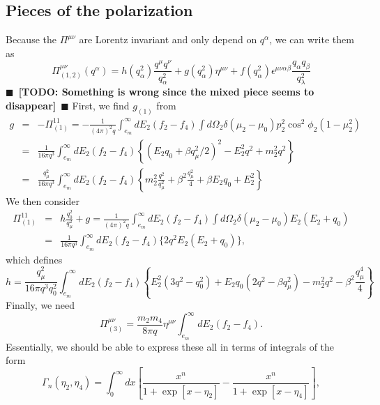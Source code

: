 \documentclass[12pt,letter]{article}
\newcommand{\todo}[1]{{$\blacksquare$~\textbf{\color{blue}[TODO: #1]}}~$\blacksquare$}
\begin{document}
\subsection{Pieces of the polarization}
Because the $\Pi^{\mu \nu}$ are Lorentz invariant and only depend on $q^\alpha$, we can write them as   
\begin{equation}
\Pi_{(1,2)}^{\mu \nu}(q^\alpha) = h(q_\alpha^2) \frac{q^\mu q^\nu}{q_\alpha^2}
+ g(q_\alpha^2) \eta^{\mu \nu} 
+ f(q_\alpha^2) \epsilon^{\mu \nu \alpha \beta} \frac{q_\alpha q_\beta}{q_\lambda^2}
\end{equation}
\todo{Something is wrong since the mixed piece seems to disappear} 
First, we find $g_{(1)}$ from 
\begin{eqnarray}
g &=& -\Pi^{11}_{(1)} = -\frac{1}{(4 \pi)^2 q} \int_{e_m}^\infty dE_2 
(f_2 - f_4) \int d\Omega_2 \delta(\mu_2 - \mu_0) p_2^2 \cos^2 \phi_2 (1-\mu_2^2)
\nonumber \\
&=& \frac{1}{16 \pi q^3} \int_{e_m}^\infty dE_2 (f_2 - f_4)
\left\{(E_2 q_0 + \beta q_\mu^2/2)^2 - E_2^2 q^2 + m_2^2 q^2\right\}
\nonumber \\ 
&=& \frac{q_\mu^2}{16 \pi q^3} \int_{e_m}^\infty dE_2 (f_2 - f_4)
\left\{m_2^2 \frac{q^2}{q_\mu^2} + \beta^2 \frac{q^2_\mu}{4} 
+ \beta E_2 q_0 + E_2^2 \right\}
\end{eqnarray}
We then consider 
\begin{eqnarray}
\Pi^{11}_{(1)}&=& h\frac{q_0^2}{q_\mu^2} + g 
= \frac{1}{(4 \pi)^2 q} \int_{e_m}^\infty dE_2 (f_2 - f_4) 
\int d\Omega_2 \delta(\mu_2 - \mu_0) E_2(E_2+q_0)
\nonumber \\
&=& \frac{1}{16 \pi q^3} \int_{e_m}^\infty dE_2 (f_2 - f_4) 
\{ 2 q^2 E_2 (E_2 + q_0) \}, 
\end{eqnarray}
which defines 
\begin{equation}
h = \frac{q_\mu^2}{16 \pi q^3 q_0^2} \int_{e_m}^\infty dE_2 (f_2 - f_4)
\left\{E_2^2(3 q^2-q_0^2) + E_2 q_0(2 q^2 - \beta q_\mu^2) 
- m_2^2 q^2 - \beta^2 \frac{q^4_\mu}{4} \right\}
\end{equation}
Finally, we need 
\begin{equation}
\Pi^{\mu \nu}_{(3)}=\frac{m_2 m_4}{8 \pi q} \eta^{\mu \nu} 
\int_{e_m}^\infty dE_2 (f_2 - f_4).
\end{equation}  
Essentially, we should be able to express these all in terms of integrals of the form 
\begin{equation}
\Gamma_n(\eta_2, \eta_4) = \int_0^\infty dx \left[ \frac{x^n}{1 + \exp[x - \eta_2]}
-\frac{ x^n}{1 + \exp[x - \eta_4]} \right],
\end{equation}
\end{document}
